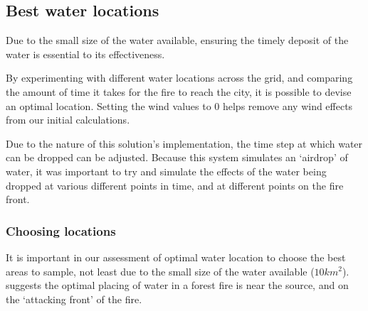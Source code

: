 \documentclass[11pt, a4paper, titlepage]{article}
\begin{document}
  \subsection{Best water locations}
  Due to the small size of the water available, ensuring the timely deposit of the water is essential to its effectiveness.

  By experimenting with different water locations across the grid, and comparing the amount of time it takes for the fire to reach the city, it is possible to devise an optimal location. Setting the wind values to 0 helps remove any wind effects from our initial calculations.

  Due to the nature of this solution's implementation, the time step at which water can be dropped can be adjusted. Because this system simulates an `airdrop' of water, it was important to try and simulate the effects of the water being dropped at various different points in time, and at different points on the fire front.

  \subsubsection{Choosing locations}
  It is important in our assessment of optimal water location to choose the best areas to sample, not least due to the small size of the water available ($10km^2$). \cite{christopher_2019} suggests the optimal placing of water in a forest fire is near the source, and on the `attacking front' of the fire.
\end{document}
